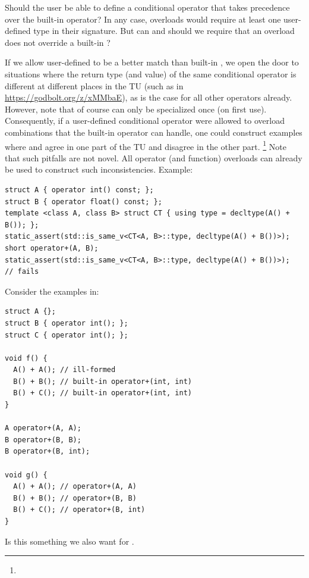 Should the user be able to define a conditional operator that takes precedence over the built-in operator?
In any case,  overloads would require at least one user-defined type in their signature.
But can and should we require that an  overload does not override a built-in ?

If we allow user-defined  to be a better match than built-in , we open the door to situations where the return type (and value) of the same conditional operator is different at different places in the TU (such as in \url{https://godbolt.org/z/xMMbaE}), as is the case for all other operators already.
However, note that of course  can only be specialized once (on first use).
Consequently, if a user-defined conditional operator were allowed to overload combinations that the built-in operator can handle, one could construct examples where  and  agree in one part of the TU and disagree in the other part.%
\footnote{}
Note that such pitfalls are not novel.
All operator (and function) overloads can already be used to construct such inconsistencies.
Example:
\medskip\begin{lstlisting}
struct A { operator int() const; };
struct B { operator float() const; };
template <class A, class B> struct CT { using type = decltype(A() + B()); };
static_assert(std::is_same_v<CT<A, B>::type, decltype(A() + B())>);
short operator+(A, B);
static_assert(std::is_same_v<CT<A, B>::type, decltype(A() + B())>);  // fails
\end{lstlisting}

Consider the examples in:
\medskip\begin{lstlisting}
struct A {};
struct B { operator int(); };
struct C { operator int(); };

void f() {
  A() + A(); // ill-formed
  B() + B(); // built-in operator+(int, int)
  B() + C(); // built-in operator+(int, int)
}

A operator+(A, A);
B operator+(B, B);
B operator+(B, int);

void g() {
  A() + A(); // operator+(A, A)
  B() + B(); // operator+(B, B)
  B() + C(); // operator+(B, int)
}
\end{lstlisting}
Is this something we also want for .

